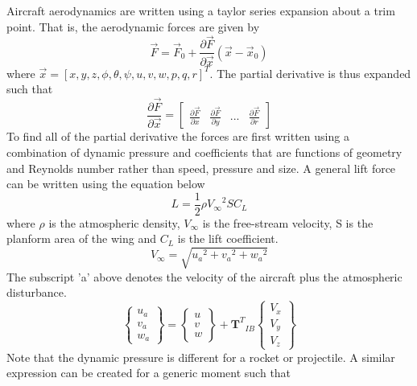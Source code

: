 \documentclass{article}
\begin{document}
Aircraft aerodynamics are written using a taylor series expansion
about a trim point\cite{phil}\cite{AndersonD}. That is, the aerodynamic forces are given by
\begin{equation}
\vec{F} = \vec{F}_0 + \frac{\partial \vec{F}}{\partial \vec{x}}(\vec{x}-\vec{x}_0)
\end{equation}
where $\vec{x} = [x,y,z,\phi,\theta,\psi,u,v,w,p,q,r]^T$. The partial
derivative is thus expanded such that
\begin{equation}
\frac{\partial \vec{F}}{\partial \vec{x}} = \begin{bmatrix} \frac{\partial
    \vec{F}}{\partial x} & \frac{\partial \vec{F}}{\partial y} & ... &
  \frac{\partial \vec{F}}{\partial r} \end{bmatrix}
\end{equation}
To find all of the partial derivative the forces are first written
using a combination of dynamic pressure and coefficients that are
functions of geometry and Reynolds number rather than speed, pressure
and size. A general lift force can be written using the equation below
\begin{equation}
L = \frac{1}2\rho {V_{\infty}}^2 S C_L
\end{equation}
where $\rho$ is the atmospheric density, $V_{\infty}$ is the
free-stream velocity, S is the planform area of the wing and $C_L$ is
the lift coefficient. 
\begin{equation}\label{e:vtotal}
  V_{\infty} = \sqrt{{u_a}^2 + {v_a}^2 + {w_a}^2}
\end{equation}
The subscript 'a' above denotes the velocity of the aircraft plus the
atmospheric disturbance. 
\begin{equation}\label{e:atm}
\begin{Bmatrix} u_a \\ v_a \\ w_a \end{Bmatrix} =
\begin{Bmatrix} u \\ v \\ w \end{Bmatrix} +
{\textbf{T}^T}_{IB} \begin{Bmatrix}
 V_x \\ V_y \\ V_z \end{Bmatrix}
\end{equation}
Note that the dynamic pressure is different for
a rocket or projectile. A similar expression can be created for a
generic moment such that
\end{document}
